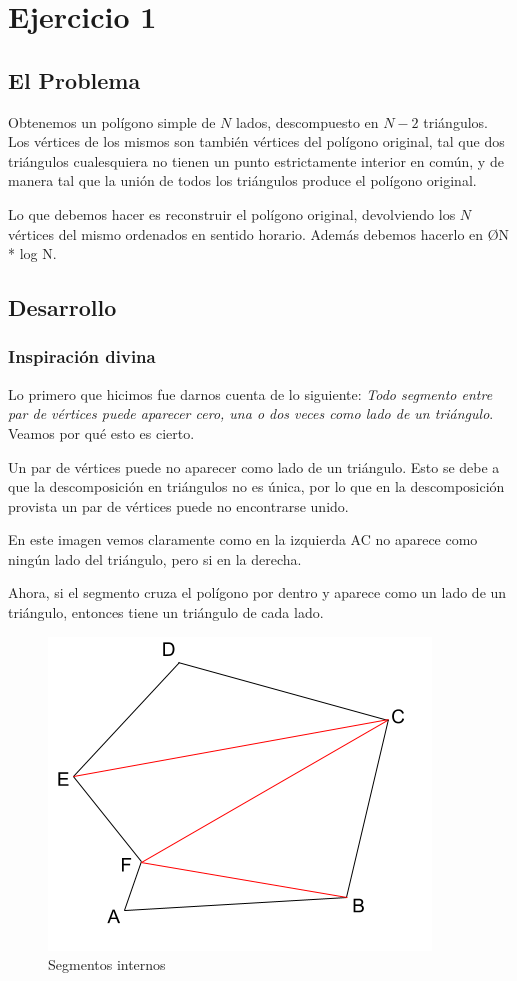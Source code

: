 \section{Ejercicio 1}
\subsection{El Problema}

Obtenemos un polígono simple de $N$ lados, descompuesto en $N - 2$ triángulos. Los vértices de los mismos son también vértices del polígono original, tal que dos triángulos cualesquiera no tienen un punto estrictamente interior en común, y de manera tal que la unión de todos los triángulos produce el polígono original. 

Lo que debemos hacer es reconstruir el polígono original, devolviendo  los $N$ vértices del mismo ordenados en sentido horario. Además debemos hacerlo en \O{N * log N}.
\subsection{Desarrollo}
\subsubsection{Inspiración divina}

Lo primero que hicimos fue darnos cuenta de lo siguiente:
\textit{Todo segmento entre par de vértices puede aparecer cero, una o dos veces como lado de un triángulo}. Veamos por qué esto es cierto. 

Un par de vértices puede no aparecer como lado de un triángulo. Esto se debe a que la descomposición en triángulos no es única, por lo que en la descomposición provista un par de vértices puede no encontrarse unido.

En este imagen vemos claramente como en la izquierda AC no aparece como ningún lado del triángulo, pero si en la derecha. 

Ahora, si el segmento cruza el polígono por dentro y aparece como un lado de un triángulo, entonces tiene un triángulo de cada lado. 
\begin{figure}[H]\centering\includegraphics[scale=0.5]{Imagenes/ej1/Imagen_B.png}\caption{Segmentos internos}\end{figure}

